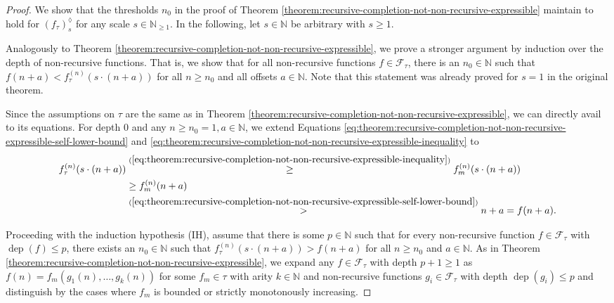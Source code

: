 \begin{proof}
	We show that the thresholds $n_0$ in the proof of Theorem \ref{theorem:recursive-completion-not-non-recursive-expressible} maintain to hold for $\left(f_{\tau}\right)_{s}^{\lozenge}$ for any scale $s\in\mathbb{N}_{\geq 1}$.
	In the following, let $s\in\mathbb{N}$ be arbitrary with $s\geq 1$.
	
	Analogously to Theorem \ref{theorem:recursive-completion-not-non-recursive-expressible}, we prove a stronger argument by induction over the depth of non-recursive functions.
	That is, we show that for all non-recursive functions $f\in\mathcal{F}_{\tau}$, there is an $n_0\in\mathbb{N}$ such that $f(n+a)<f_{\tau}^{(n)}(s\cdot(n+a))$ for all $n\geq n_0$ and all offsets $a\in\mathbb{N}$.
	Note that this statement was already proved for $s=1$ in the original theorem.
	
	Since the assumptions on $\tau$ are the same as in Theorem \ref{theorem:recursive-completion-not-non-recursive-expressible}, we can directly avail to its equations.
	For depth $0$ and any $n\geq n_0=1,a\in\mathbb{N}$, we extend Equations \ref{eq:theorem:recursive-completion-not-non-recursive-expressible-self-lower-bound} and \ref{eq:theorem:recursive-completion-not-non-recursive-expressible-inequality} to
	\begin{align}
		f_{\tau}^{(n)}(s\cdot (n+a)) &\overset{(\ref{eq:theorem:recursive-completion-not-non-recursive-expressible-inequality})}{\geq} f_m^{(n)}(s\cdot (n+a))\\
		&\geq f_m^{(n)}(n+a)\\
		\label{eq:cor-scaled-recursive-completion-not-non-recursive-expressible-self-lower-bound}
		&\overset{(\ref{eq:theorem:recursive-completion-not-non-recursive-expressible-self-lower-bound})}{>}n+a  = f(n+a).
	\end{align}
	
	Proceeding with the induction hypothesis (IH), assume that there is some $p\in\mathbb{N}$ such that for every non-recursive function $f\in\mathcal{F}_{\tau}$ with $\operatorname{dep}(f)\leq p$, there exists an $n_0\in\mathbb{N}$ such that $f_\tau^{(n)}(s\cdot(n+a))>f(n+a)$ for all $n\geq n_0$ and $a\in\mathbb{N}$. 
	As in Theorem \ref{theorem:recursive-completion-not-non-recursive-expressible}, we expand any $f\in\mathcal{F}_{\tau}$ with depth $p+1\geq 1$ as $f(n)=f_m(g_1(n),\dots,g_k(n))$ for some $f_m\in\tau$ with arity $k\in\mathbb{N}$ and non-recursive functions $g_i\in \mathcal{F}_{\tau}$ with depth $\operatorname{dep}(g_i)\leq p$ and distinguish by the cases where $f_m$ is bounded or strictly monotonously increasing.
	

\end{proof}
